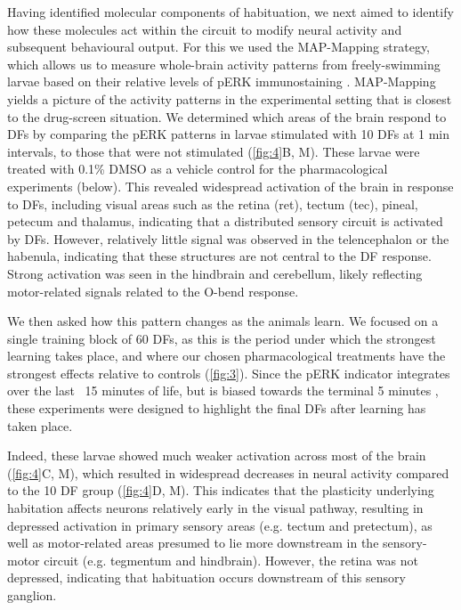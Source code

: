 \documentclass[9pt,lineno]{RandlettLab_elife}
\begin{document}
Having identified molecular components of habituation, we next aimed to identify how these molecules act within the circuit to modify neural activity and subsequent behavioural output. For this we used the MAP-Mapping strategy, which allows us to measure whole-brain activity patterns from freely-swimming larvae based on their relative levels of pERK immunostaining \cite{Randlett2015-hy}. MAP-Mapping yields a picture of the activity patterns in the experimental setting that is closest to the drug-screen situation. We determined which areas of the brain respond to DFs by comparing the pERK patterns in larvae stimulated with 10 DFs at 1 min intervals, to those that were not stimulated (\autoref{fig:4}B, M). These larvae were treated with 0.1\% DMSO as a vehicle control for the pharmacological experiments (below). This revealed widespread activation of the brain in response to DFs, including visual areas such as the retina (ret), tectum (tec), pineal, petecum and thalamus, indicating that a distributed sensory circuit is activated by DFs. However, relatively little signal was observed in the telencephalon or the habenula, indicating that these structures are not central to the DF response. Strong activation was seen in the hindbrain and cerebellum, likely reflecting motor-related signals related to the O-bend response. 

We then asked how this pattern changes as the animals learn. We focused on a single training block of 60 DFs, as this is the period under which the strongest learning takes place, and where our chosen pharmacological treatments have the strongest effects relative to controls (\autoref{fig:3}). Since the pERK indicator integrates over the last ~15 minutes of life, but is biased towards the terminal 5 minutes \cite{Randlett2015-hy}, these experiments were designed to highlight the final DFs after learning has taken place.



Indeed, these larvae showed much weaker activation across most of the brain (\autoref{fig:4}C, M), which resulted in widespread decreases in neural activity compared to the 10 DF group (\autoref{fig:4}D, M). This indicates that the plasticity underlying habitation affects neurons relatively early in the visual pathway, resulting in depressed activation in primary sensory areas (e.g. tectum and pretectum), as well as motor-related areas presumed to lie more downstream in the sensory-motor circuit (e.g. tegmentum and hindbrain). However, the retina was not depressed, indicating that habituation occurs downstream of this sensory ganglion. 
\end{document}
